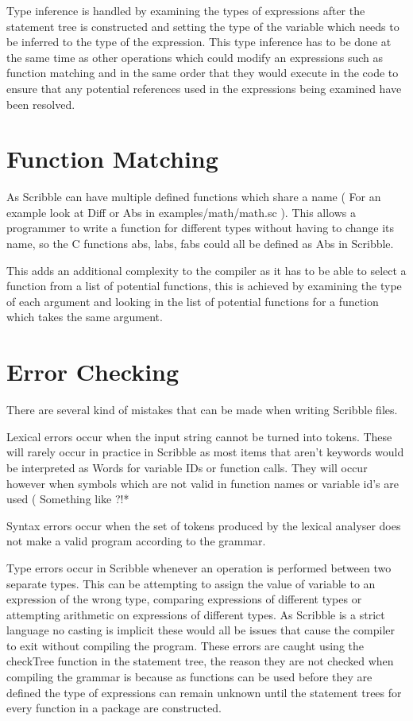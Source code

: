 \documentclass[]{final_report}
\begin{document}
Type inference is handled by examining the types of expressions after the statement tree is constructed and setting the type of the variable which needs to be inferred to the type of the expression. This type inference has to be done at the same time as other operations which could modify an expressions such as function matching and in the same order that they would execute in the code to ensure that any potential references used in the expressions being examined have been resolved.

\section{Function Matching}

As Scribble can have multiple defined functions which share a name ( For an example look at Diff or Abs in examples/math/math.sc ). This allows a programmer to write a function for different types without having to change its name, so the C functions abs, labs, fabs could all be defined as Abs in Scribble.

This adds an additional complexity to the compiler as it has to be able to select a function from a list of potential functions, this is achieved by examining the type of each argument and looking in the list of potential functions for a function which takes the same argument. 

\section{Error Checking}

There are several kind of mistakes that can be made when writing Scribble files. 

Lexical errors occur when the input string cannot be turned into tokens. These will rarely occur in practice in Scribble as most items that aren't keywords would be interpreted as Words for variable IDs or function calls. They will occur however when symbols which are not valid in function names or variable id's are used ( Something like ?!*%

Syntax errors occur when the set of tokens produced by the lexical analyser does not make a valid program according to the grammar. 

Type errors occur in Scribble whenever an operation is performed between two separate types. This can be attempting to assign the value of variable to an expression of the wrong type, comparing expressions of different types or attempting arithmetic on expressions of different types. As Scribble is a strict language no casting is implicit these would all be issues that cause the compiler to exit without compiling the program. These errors are caught using the checkTree function in the statement tree, the reason they are not checked when compiling the grammar is because as functions can be used before they are defined the type of expressions can remain unknown until the statement trees for every function in a package are constructed.
\end{document}
